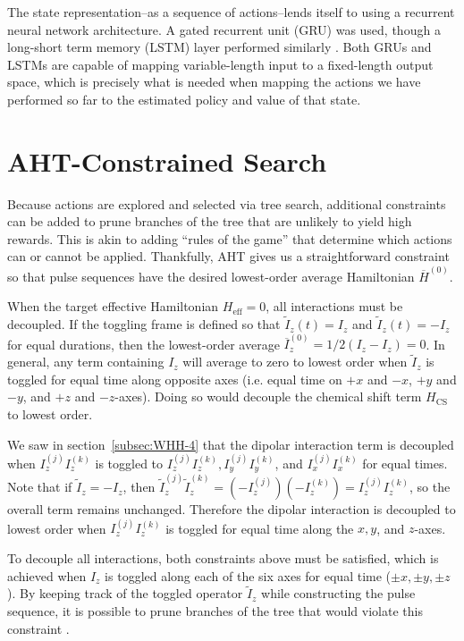 The state representation--as a sequence of actions--lends itself to using a recurrent neural network architecture. A gated recurrent unit (GRU) was used, though a long-short term memory (LSTM) layer performed similarly \cite{cho2014learning, lstm}.
Both GRUs and LSTMs are capable of mapping variable-length input to a fixed-length output space, which is precisely what is needed when mapping the actions we have performed so far to the estimated policy and value of that state.


\section{AHT-Constrained Search}\label{sec:AHT-constraints}

Because actions are explored and selected via tree search, additional constraints can be added to prune branches of the tree that are unlikely to yield high rewards.
This is akin to adding ``rules of the game'' that determine which actions can or cannot be applied.
Thankfully, AHT gives us a straightforward constraint so that pulse sequences have the desired lowest-order average Hamiltonian $\overline{H}^{(0)}$.

When the target effective Hamiltonian $H_\text{eff} = 0$, all interactions must be decoupled. If the toggling frame is defined so that $\widetilde{I}_z(t) = I_z$ and $\widetilde{I}_z(t) = -I_z$ for equal durations, then the lowest-order average $\overline{I}_z^{(0)} = 1/2(I_z - I_z) = 0$. In general, any term containing $I_z$ will average to zero to lowest order when $\widetilde{I}_z$ is toggled for equal time along opposite axes (i.e. equal time on $+x$ and $-x$, $+y$ and $-y$, and $+z$ and $-z$-axes).
Doing so would decouple the chemical shift term $H_\text{CS}$ to lowest order.

We saw in section~\ref{subsec:WHH-4} that the dipolar interaction term is decoupled when $I_z^{(j)}I_z^{(k)}$ is toggled to $I_z^{(j)}I_z^{(k)}, I_y^{(j)}I_y^{(k)}$, and $I_x^{(j)}I_x^{(k)}$ for equal times.
Note that if $\widetilde{I}_z = -I_z$, then $\widetilde{I}_z^{(j)}\widetilde{I}_z^{(k)} = (-I_z^{(j)})(-I_z^{(k)}) = I_z^{(j)}I_z^{(k)}$, so the overall term remains unchanged.
Therefore the dipolar interaction is decoupled to lowest order when $I_z^{(j)}I_z^{(k)}$ is toggled for equal time along the $x, y$, and $z$-axes.

To decouple all interactions, both constraints above must be satisfied, which is achieved when $I_z$ is toggled along each of the six axes for equal time ($\pm x, \pm y, \pm z$). By keeping track of the toggled operator $\widetilde{I}_z$ while constructing the pulse sequence, it is possible to prune branches of the tree that would violate this constraint%
.

